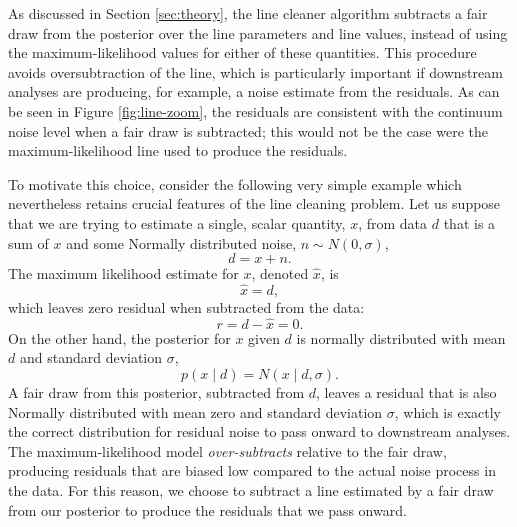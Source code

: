 \documentclass[modern]{aastex631}
\begin{document}
As discussed in Section \ref{sec:theory}, the line cleaner algorithm subtracts a
fair draw from the posterior over the line parameters and line values, instead
of using the maximum-likelihood values for either of these quantities.  This
procedure avoids oversubtraction of the line, which is particularly important if
downstream analyses are producing, for example, a noise estimate from the
residuals.  As can be seen in Figure \ref{fig:line-zoom}, the residuals are
consistent with the continuum noise level when a fair draw is subtracted; this
would not be the case were the maximum-likelihood line used to produce the
residuals.

To motivate this choice, consider the following very simple example which nevertheless retains crucial features of the line cleaning problem.  Let us suppose that we are trying to estimate a single, scalar quantity, $x$, from data $d$ that is a sum of $x$ and some Normally distributed noise, $n \sim N(0,\sigma)$,
\begin{equation}
    d = x + n.
\end{equation}
The maximum likelihood estimate for $x$, denoted $\hat{x}$, is 
\begin{equation}
    \hat{x} = d,
\end{equation}
which leaves zero residual when subtracted from the data:
\begin{equation}
    r = d - \hat{x} = 0.
\end{equation}
On the other hand, the posterior for $x$ given $d$ is normally distributed with
mean $d$ and standard deviation $\sigma$,
\begin{equation}
    p(x \mid d) = N(x \mid d, \sigma).
\end{equation}
A fair draw from this posterior, subtracted from $d$, leaves a residual that is
also Normally distributed with mean zero and standard deviation $\sigma$, which
is exactly the correct distribution for residual noise to pass onward to
downstream analyses.  The maximum-likelihood model \emph{over-subtracts}
relative to the fair draw, producing residuals that are biased low compared to
the actual noise process in the data.  For this reason, we choose to subtract a
line estimated by a fair draw from our posterior to produce the residuals that
we pass onward.



\end{document}
